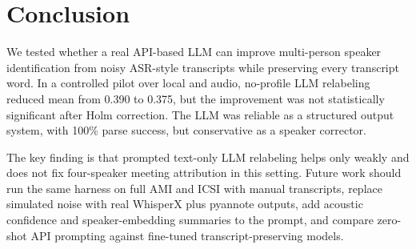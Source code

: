 \section{Conclusion}
\label{sec:conclusion}

We tested whether a real API-based LLM can improve multi-person speaker identification from noisy ASR-style transcripts while preserving every transcript word. In a controlled pilot over local \amisdm and \simsamu audio, no-profile LLM relabeling reduced mean \wder from 0.390 to 0.375, but the improvement was not statistically significant after Holm correction. The LLM was reliable as a structured output system, with 100\% parse success, but conservative as a speaker corrector.

The key finding is that prompted text-only LLM relabeling helps only weakly and does not fix four-speaker meeting attribution in this setting. Future work should run the same harness on full AMI and ICSI with manual transcripts, replace simulated noise with real WhisperX plus pyannote outputs, add acoustic confidence and speaker-embedding summaries to the prompt, and compare zero-shot API prompting against fine-tuned transcript-preserving models.
